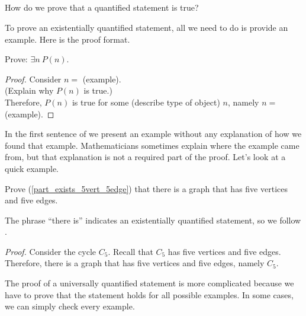\subsection{\subpffquants}
\label{sub_pff_quants}

How do we prove that a quantified statement is true?

To prove an existentially quantified statement, all we need to do is provide an example.  Here is the proof format.

\begin{pff}
\label{pff_exists}  
    Prove: $\exists n ~ P(n)$.

    \begin{proof} Consider $n=$ (example).\\
    (Explain why $P(n)$ is true.)\\
    Therefore, $P(n)$ is true for some (describe type of object) $n$, namely $n=$ (example).       
    \end{proof}
\end{pff}

In the first sentence of  we present an example without any explanation of how we found that example.  Mathematicians sometimes explain where the example came from, but that explanation is not a required part of the proof.  Let's look at a quick example.

\begin{exam}
\label{exam_exists_graph_5vert_5edge}
    Prove  (\ref{part_exists_5vert_5edge}) that there is a graph that has five vertices and five edges.
        \begin{soln}
            The phrase ``there is'' indicates an existentially quantified statement, so we follow .
            
                \emph{Proof.} 
                    Consider the cycle $C_5$.  Recall that $C_5$ has five vertices and five edges.  Therefore, there is a graph that has five vertices and five edges, namely $C_5$.     
        \end{soln}
\end{exam}

The proof of a universally quantified statement is more complicated because we have to prove that the statement holds for all possible examples.  In some cases, we can simply check every example.

